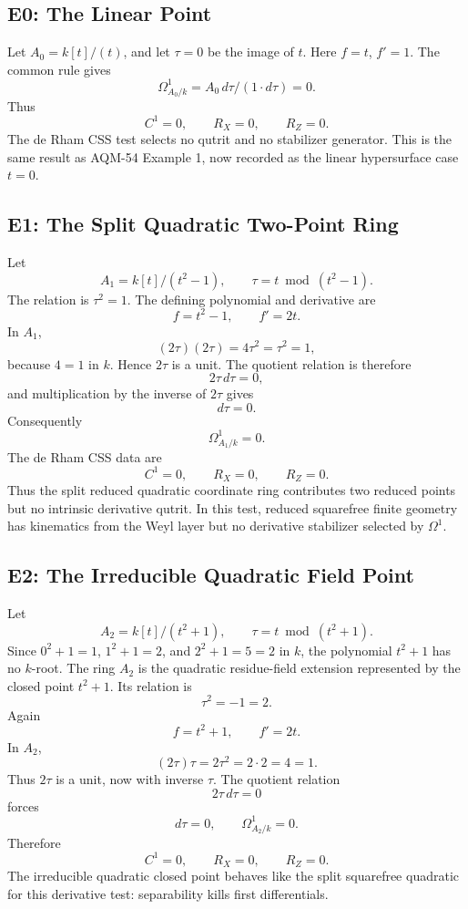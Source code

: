 \subsection{E0: The Linear Point}
Let \(A_0=k[t]/(t)\), and let \(\tau=0\) be the image of \(t\).  Here
\(f=t\), \(f'=1\).  The common rule gives
\[
  \Omega^1_{A_0/k}=A_0\,d\tau/(1\cdot d\tau)=0.
\]
Thus
\[
  C^1=0,\qquad R_X=0,\qquad R_Z=0.
\]
The de Rham CSS test selects no qutrit and no stabilizer generator.  This is
the same result as AQM-54 Example 1, now recorded as the linear hypersurface
case \(t=0\).
\subsection{E1: The Split Quadratic Two-Point Ring}
Let
\[
  A_1=k[t]/(t^2-1),\qquad \tau=t\bmod(t^2-1).
\]
The relation is \(\tau^2=1\).  The defining polynomial and derivative are
\[
  f=t^2-1,\qquad f'=2t.
\]
In \(A_1\),
\[
  (2\tau)(2\tau)=4\tau^2=\tau^2=1,
\]
because \(4=1\) in \(k\).  Hence \(2\tau\) is a unit.  The quotient relation
is therefore
\[
  2\tau\,d\tau=0,
\]
and multiplication by the inverse of \(2\tau\) gives
\[
  d\tau=0.
\]
Consequently
\[
  \Omega^1_{A_1/k}=0.
\]
The de Rham CSS data are
\[
  C^1=0,\qquad R_X=0,\qquad R_Z=0.
\]
Thus the split reduced quadratic coordinate ring contributes two reduced
points but no intrinsic derivative qutrit.  In this test, reduced squarefree
finite geometry has kinematics from the Weyl layer but no derivative
stabilizer selected by \(\Omega^1\).
\subsection{E2: The Irreducible Quadratic Field Point}
Let
\[
  A_2=k[t]/(t^2+1),\qquad \tau=t\bmod(t^2+1).
\]
Since \(0^2+1=1\), \(1^2+1=2\), and \(2^2+1=5=2\) in \(k\), the polynomial
\(t^2+1\) has no \(k\)-root.  The ring \(A_2\) is the quadratic residue-field
extension represented by the closed point \(t^2+1\).  Its relation is
\[
  \tau^2=-1=2.
\]
Again
\[
  f=t^2+1,\qquad f'=2t.
\]
In \(A_2\),
\[
  (2\tau)\tau=2\tau^2=2\cdot2=4=1.
\]
Thus \(2\tau\) is a unit, now with inverse \(\tau\).  The quotient relation
\[
  2\tau\,d\tau=0
\]
forces
\[
  d\tau=0,\qquad \Omega^1_{A_2/k}=0.
\]
Therefore
\[
  C^1=0,\qquad R_X=0,\qquad R_Z=0.
\]
The irreducible quadratic closed point behaves like the split squarefree
quadratic for this derivative test: separability kills first differentials.
